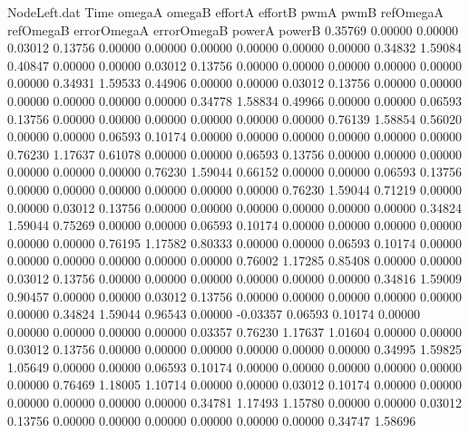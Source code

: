 \begin{filecontents}{NodeLeft.dat}
Time omegaA omegaB effortA effortB pwmA pwmB refOmegaA refOmegaB errorOmegaA errorOmegaB powerA powerB
   0.35769    0.00000    0.00000     0.03012    0.13756    0.00000    0.00000    0.00000    0.00000    0.00000    0.00000    0.34832    1.59084
   0.40847    0.00000    0.00000     0.03012    0.13756    0.00000    0.00000    0.00000    0.00000    0.00000    0.00000    0.34931    1.59533
   0.44906    0.00000    0.00000     0.03012    0.13756    0.00000    0.00000    0.00000    0.00000    0.00000    0.00000    0.34778    1.58834
   0.49966    0.00000    0.00000     0.06593    0.13756    0.00000    0.00000    0.00000    0.00000    0.00000    0.00000    0.76139    1.58854
   0.56020    0.00000    0.00000     0.06593    0.10174    0.00000    0.00000    0.00000    0.00000    0.00000    0.00000    0.76230    1.17637
   0.61078    0.00000    0.00000     0.06593    0.13756    0.00000    0.00000    0.00000    0.00000    0.00000    0.00000    0.76230    1.59044
   0.66152    0.00000    0.00000     0.06593    0.13756    0.00000    0.00000    0.00000    0.00000    0.00000    0.00000    0.76230    1.59044
   0.71219    0.00000    0.00000     0.03012    0.13756    0.00000    0.00000    0.00000    0.00000    0.00000    0.00000    0.34824    1.59044
   0.75269    0.00000    0.00000     0.06593    0.10174    0.00000    0.00000    0.00000    0.00000    0.00000    0.00000    0.76195    1.17582
   0.80333    0.00000    0.00000     0.06593    0.10174    0.00000    0.00000    0.00000    0.00000    0.00000    0.00000    0.76002    1.17285
   0.85408    0.00000    0.00000     0.03012    0.13756    0.00000    0.00000    0.00000    0.00000    0.00000    0.00000    0.34816    1.59009
   0.90457    0.00000    0.00000     0.03012    0.13756    0.00000    0.00000    0.00000    0.00000    0.00000    0.00000    0.34824    1.59044
   0.96543    0.00000   -0.03357     0.06593    0.10174    0.00000    0.00000    0.00000    0.00000    0.00000    0.03357    0.76230    1.17637
   1.01604    0.00000    0.00000     0.03012    0.13756    0.00000    0.00000    0.00000    0.00000    0.00000    0.00000    0.34995    1.59825
   1.05649    0.00000    0.00000     0.06593    0.10174    0.00000    0.00000    0.00000    0.00000    0.00000    0.00000    0.76469    1.18005
   1.10714    0.00000    0.00000     0.03012    0.10174    0.00000    0.00000    0.00000    0.00000    0.00000    0.00000    0.34781    1.17493
   1.15780    0.00000    0.00000     0.03012    0.13756    0.00000    0.00000    0.00000    0.00000    0.00000    0.00000    0.34747    1.58696

\end{filecontents}
